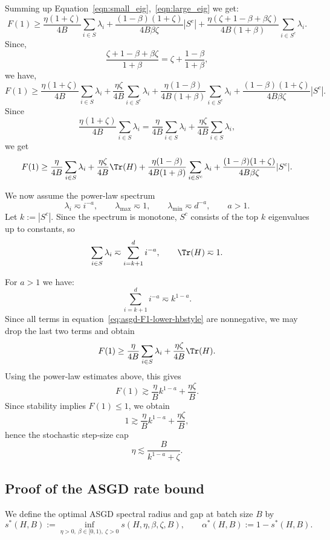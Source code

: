 \documentclass{article}
\def\eqref#1{equation~\ref{#1}}
\begin{document}
Summing up Equation~\ref{eqn:small_eig},~\ref{eqn:large_eig} we get:
\[
F(1)
\ge
\frac{\eta(1+\zeta)}{4B}\sum_{i\in S}\lambda_i
+
\frac{(1-\beta)(1+\zeta)}{4B\beta\zeta}|S^c|
+
\frac{\eta(\zeta+1-\beta+\beta\zeta)}{4B(1+\beta)}
\sum_{i\in S^c}\lambda_i.
\]
Since,
\[
\frac{\zeta+1-\beta+\beta\zeta}{1+\beta}
=
\zeta+\frac{1-\beta}{1+\beta},
\]
we have,
\[
F(1)
\ge
\frac{\eta(1+\zeta)}{4B}\sum_{i\in S}\lambda_i
+
\frac{\eta\zeta}{4B}\sum_{i\in S^c}\lambda_i
+
\frac{\eta(1-\beta)}{4B(1+\beta)}\sum_{i\in S^c}\lambda_i
+
\frac{(1-\beta)(1+\zeta)}{4B\beta\zeta}|S^c|.
\]
Since
\[
\frac{\eta(1+\zeta)}{4B}\sum_{i\in S}\lambda_i
=
\frac{\eta}{4B}\sum_{i\in S}\lambda_i
+
\frac{\eta\zeta}{4B}\sum_{i\in S}\lambda_i,
\]
we get
\begin{equation}
F(1)
\ge
\frac{\eta}{4B}\sum_{i\in S}\lambda_i
+
\frac{\eta\zeta}{4B}\Tr(H)
+
\frac{\eta(1-\beta)}{4B(1+\beta)}\sum_{i\in S^c}\lambda_i
+
\frac{(1-\beta)(1+\zeta)}{4B\beta\zeta}|S^c|.
\label{eq:asgd-F1-lower-hbstyle}
\end{equation}

We now assume the power-law spectrum
\[
\lambda_i\eqsim i^{-a},
\qquad
\lambda_{\max}\eqsim 1,
\qquad
\lambda_{\min}\eqsim d^{-a},
\qquad
a>1.
\]
Let \(k:=|S^c|\). Since the spectrum is monotone, \(S^c\) consists of the top
\(k\) eigenvalues up to constants, so
\[
\sum_{i\in S}\lambda_i
\eqsim
\sum_{i=k+1}^d i^{-a},
\qquad
\Tr(H)\eqsim 1.
\]

For $a>1$ we have:
\[
\sum_{i=k+1}^d i^{-a}\eqsim k^{1-a}.
\]
Since all terms in \eqref{eq:asgd-F1-lower-hbstyle} are nonnegative, we may
drop the last two terms and obtain
\[
F(1)
\ge
\frac{\eta}{4B}\sum_{i\in S}\lambda_i
+
\frac{\eta\zeta}{4B}\Tr(H).
\]
Using the power-law estimates above, this gives
\[
F(1)
\gtrsim
\frac{\eta}{B}k^{1-a}
+
\frac{\eta\zeta}{B}.
\]
Since stability implies \(F(1)\le 1\), we obtain
\[
1\gtrsim \frac{\eta}{B}k^{1-a}+\frac{\eta\zeta}{B},
\]
hence the stochastic step-size cap
\begin{equation}
\label{eq:asgd-step-cap-stoch-hbstyle}
\eta\lesssim \frac{B}{k^{1-a}+\zeta}.
\end{equation}

\subsection{Proof of the ASGD rate bound}

We define the optimal ASGD spectral radius and gap at batch size \(B\) by
\[
s^*(H,B)
:=
\inf_{\eta>0,\ \beta\in[0,1),\ \zeta>0}
s(H,\eta,\beta,\zeta,B),
\qquad
\alpha^*(H,B)
:=
1-s^*(H,B).
\]
\end{document}

